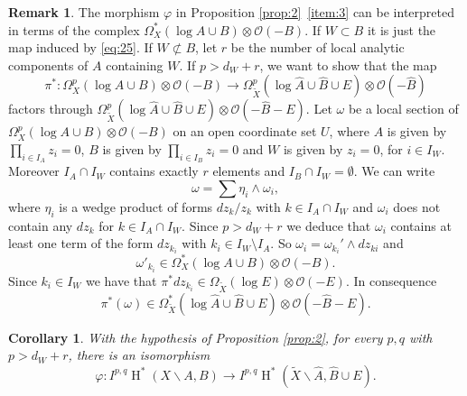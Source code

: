 \documentclass[11pt,a4paper]{amsart}
\newcommand{\caO}{\mathcal{O}}
\DeclareMathOperator{\rH}{H}
\numberwithin{equation}{section}
\theoremstyle{plain}
\newtheorem{cor}[prop]{Corollary}
\theoremstyle{definition}
\newtheorem{rmk}[prop]{Remark}
\begin{document}
 \begin{rmk}\label{rem:4} The morphism $\varphi$ in Proposition
   \ref{prop:2}~\ref{item:3} can be interpreted 
   in terms of the complex $\Omega ^{\ast}_{X}(\log A\cup B)\otimes
   \caO(-B)$. If $W\subset B$ it is just the map induced by
   \eqref{eq:25}. If $W\not \subset B$, let $r$ be the number of
   local analytic components of $A$ containing $W$. If $p>d_{W}+r$, we want to show
   that the map 
   \begin{displaymath}
     \pi ^{\ast} \colon \Omega ^{p}_{X}(\log A\cup B)\otimes \caO(-B)
     \longrightarrow
     \Omega ^{p}_{\widetilde X}(\log \widehat A\cup \widehat B\cup E)\otimes
     \caO(-\widehat B) 
   \end{displaymath}
   factors through $\Omega ^{p}_{\widetilde X}(\log \widehat A\cup
   \widehat B\cup E)\otimes
     \caO(-\widehat B-E)$.
   Let $\omega $ be a
   local section of $\Omega ^{p}_{X}(\log A\cup B)\otimes \caO(-B)$
   on an open coordinate set $U$, where $A$ is given by $\prod_{i\in
     I_{A}}z_{i}=0$, $B$ is given by $\prod_{i\in
     I_{B}}z_{i}=0$ and $W$ is given by $z_{i}=0$, for $i\in
   I_{W}$. Moreover $I_{A}\cap I_{W}$ contains exactly $r$ elements
   and $I_{B}\cap I_{W}=\emptyset$. We can write
   \begin{displaymath}
     \omega = \sum \eta_{i}\wedge \omega_{i}, 
   \end{displaymath}
   where $\eta_{i}$ is a wedge product of forms $dz_{k}/z_{k}$ with
   $k\in I_{A}\cap I_{W}$ and $\omega _{i}$ does not contain any
   $dz_{k}$ for $k\in I_{A}\cap I_{W}$.  Since $p>d_{W}+r$ we
 deduce that $\omega _{i}$ contains at least one term of the form $dz_{k_{i}}$ with
 $k_{i}\in I_{W}\setminus I_{A}$. So $\omega _{i}=\omega
 _{k_{i}}'\wedge dz_{ki}$ and 
   \begin{displaymath}
     \omega' _{k_{i}}\in \Omega _{X}^{\ast}(\log A\cup B)\otimes \caO(-B).
   \end{displaymath}
   Since $k_{i}\in I_{W}$ we have that $\pi ^{\ast}dz_{k_{i}} \in \Omega
   _{\widetilde X}(\log E)\otimes \caO(-E)$.
In consequence 
 \begin{displaymath}
   \pi ^{\ast}(\omega )\in
   \Omega _{\widetilde X}^{\ast}(\log \widehat{A}\cup \widehat B\cup
   E)\otimes \caO(-\widehat B-E).
 \end{displaymath}
 \end{rmk}
 \begin{cor}\label{cor:4}
   With the hypothesis of Proposition \ref{prop:2}, for every $p,q$
   with $p>d_W+r$, there is an isomorphism
   \begin{displaymath}
\varphi\colon 
I^{p,q}\rH^{\ast}(X\smallsetminus A,B)
\longrightarrow
     I^{p,q}\rH^{\ast}(\widetilde X\smallsetminus \widehat A,
        \widehat B\cup E).
      \end{displaymath}
 \end{cor}
\end{document}
